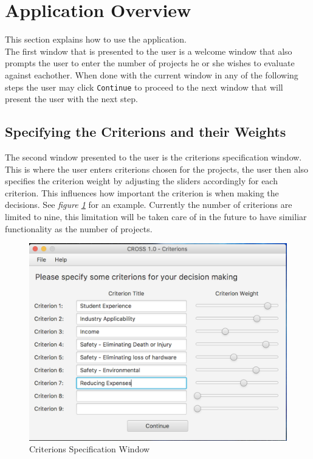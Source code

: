 \documentclass[11pt]{article}
\newcommand{\code}[1]{\texttt{#1}}
\begin{document}
	\section{Application Overview}
		This section explains how to use the application.\\
		
		The first window that is presented to the user is a welcome window that also prompts the user to enter the number of projects he or she wishes to evaluate against eachother. When done with the current window in any of the following steps the user may click \code{Continue} to proceed to the next window that will present the user with the next step.
		
		\subsection{Specifying the Criterions and their Weights}
			The second window presented to the user is the criterions specification window. This is where the user enters criterions chosen for the projects, the user then also specifies the criterion weight by adjusting the sliders accordingly for each criterion. This influences how important the criterion is when making the decisions. See \textit{figure \ref{fig:criterions}} for an example. Currently the number of criterions are limited to nine, this limitation will be taken care of in the future to have similiar functionality as the number of projects.
			
			\begin{figure}[!htb]
				\centering
				\includegraphics[scale=0.55]{criterions}
				\caption{Criterions Specification Window} %
				\label{fig:criterions} %
			\end{figure}
			
\end{document}
